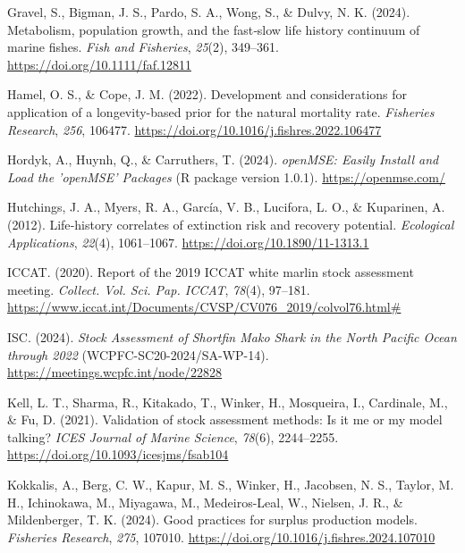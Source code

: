 \documentclass[
  11pt,
]{SCreport}
\newlength{\cslhangindent}
\newenvironment{CSLReferences}[2] %
 {\begin{list}{}{%
  \setlength{\itemindent}{0pt}
  \setlength{\leftmargin}{0pt}
  \setlength{\parsep}{0pt}
  \ifodd #1
   \setlength{\leftmargin}{\cslhangindent}
   \setlength{\itemindent}{-1\cslhangindent}
  \fi
  \setlength{\itemsep}{#2\baselineskip}}}
 {\end{list}}
\begin{document}
\begin{CSLReferences}{1}{0}
Gravel, S., Bigman, J. S., Pardo, S. A., Wong, S., \& Dulvy, N. K.
(2024). Metabolism, population growth, and the fast‐slow life history
continuum of marine fishes. \emph{Fish and Fisheries}, \emph{25}(2),
349--361. \url{https://doi.org/10.1111/faf.12811}

Hamel, O. S., \& Cope, J. M. (2022). Development and considerations for
application of a longevity-based prior for the natural mortality rate.
\emph{Fisheries Research}, \emph{256}, 106477.
\url{https://doi.org/10.1016/j.fishres.2022.106477}

Hordyk, A., Huynh, Q., \& Carruthers, T. (2024). \emph{{openMSE}:
{Easily} {Install} and {Load} the '{openMSE}' {Packages}} (R package
version 1.0.1). \url{https://openmse.com/}

Hutchings, J. A., Myers, R. A., García, V. B., Lucifora, L. O., \&
Kuparinen, A. (2012). Life‐history correlates of extinction risk and
recovery potential. \emph{Ecological Applications}, \emph{22}(4),
1061--1067. \url{https://doi.org/10.1890/11-1313.1}

ICCAT. (2020). Report of the 2019 {ICCAT} white marlin stock assessment
meeting. \emph{Collect. Vol. Sci. Pap. ICCAT}, \emph{78}(4), 97--181.
\url{https://www.iccat.int/Documents/CVSP/CV076_2019/colvol76.html\#}

ISC. (2024). \emph{Stock {Assessment} of {Shortfin} {Mako} {Shark} in
the {North} {Pacific} {Ocean} through 2022} (WCPFC-SC20-2024/SA-WP-14).
\url{https://meetings.wcpfc.int/node/22828}

Kell, L. T., Sharma, R., Kitakado, T., Winker, H., Mosqueira, I.,
Cardinale, M., \& Fu, D. (2021). Validation of stock assessment methods:
Is it me or my model talking? \emph{ICES Journal of Marine Science},
\emph{78}(6), 2244--2255. \url{https://doi.org/10.1093/icesjms/fsab104}

Kokkalis, A., Berg, C. W., Kapur, M. S., Winker, H., Jacobsen, N. S.,
Taylor, M. H., Ichinokawa, M., Miyagawa, M., Medeiros-Leal, W., Nielsen,
J. R., \& Mildenberger, T. K. (2024). Good practices for surplus
production models. \emph{Fisheries Research}, \emph{275}, 107010.
\url{https://doi.org/10.1016/j.fishres.2024.107010}


\end{CSLReferences}
\end{document}
